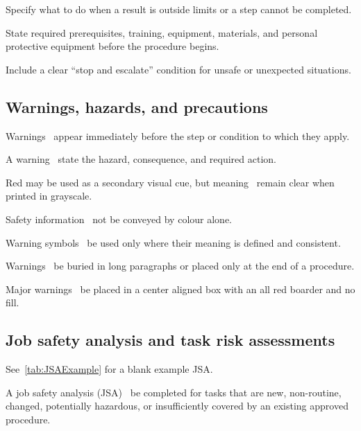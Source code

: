 Specify what to do when a result is outside limits or a step cannot be completed.

State required prerequisites, training, equipment, materials, and personal protective equipment before the procedure begins.

Include a clear “stop and escalate” condition for unsafe or unexpected situations.

\subsection{Warnings, hazards, and precautions}

Warnings \must~appear immediately before the step or condition to which they apply.

A warning \must~state the hazard, consequence, and required action.

Red may be used as a secondary visual cue, but meaning \must~remain clear when printed in grayscale.

Safety information \must~not be conveyed by colour alone.

Warning symbols \should~be used only where their meaning is defined and consistent.

Warnings \shouldnot~be buried in long paragraphs or placed only at the end of a procedure.

Major warnings \may~be placed in a center aligned box with an all red boarder and no fill.

\subsection{Job safety analysis and task risk assessments}

See~\ref{tab:JSAExample} for a blank example JSA.

A job safety analysis (JSA) \must~be completed for tasks that are new, non-routine, changed, potentially hazardous, or insufficiently covered by an existing approved procedure.

